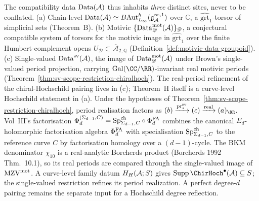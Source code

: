 \begin{remark}
\label{rem:motivic-sv-crosslevel}
The compatibility data $\mathrm{Data}(\mathcal{A})$ thus inhabits \emph{three}
distinct sites, never to be conflated.
\textup{(a)} Chain-level
$\mathrm{Data}(\mathcal{A})\simeq B\mathrm{Aut}^h_{L_\infty}(\mathfrak g^{\infty,1}_{\mathcal{A}})$
over $\mathbb C$, a $\widehat{\mathrm{grt}}_1$-torsor of
simplicial sets (Theorem~B).
\textup{(b)} Motivic
$\{\mathrm{Data}^{\mathrm{mot}}_{\mathscr D}(\mathcal{A})\}_{\mathscr D}$, a conjectural
compatible system of torsors for the motivic image in
$\widehat{\mathrm{grt}}_1$ over the finite Humbert-complement opens
$U_{\mathscr D}\subset\overline{\mathcal A}_{2,\mathbb Q}$
(Definition~\ref{def:motivic-data-groupoid}).
\textup{(c)} Single-valued $\mathrm{Data}^{\mathrm{sv}}(\mathcal{A})$, the image of
$\mathrm{Data}^{\mathrm{mot}}_{\mathscr D}(\mathcal{A})$ under Brown's single-valued period
projection, carrying
$\mathrm{Gal}(\CC/\RR)$-invariant real motivic periods
(Theorem~\ref{thm:sv-scope-restriction-chiralhoch}).
The real-period refinement of the chiral-Hochschild pairing lives in
(c); Theorem~H itself is a curve-level Hochschild statement in (a).
Under the hypotheses of Theorem~\ref{thm:sv-scope-restriction-chiralhoch},
period realisation factors as
$(b)\xrightarrow{\proj_*}(c)\xrightarrow{\mathrm{real}}(a)_\RR$.
Vol~III's factorisation
$\Phi_d^{(\Sigma_{d-1},C)} = \mathrm{Sp}^{\mathrm{ch}}_{\Sigma_{d-1}, C} \circ \Phi^{\mathrm{FA}}_d$
combines the canonical $E_d$-holomorphic factorisation algebra
$\Phi^{\mathrm{FA}}_d$ with specialisation
$\mathrm{Sp}^{\mathrm{ch}}_{\Sigma_{d-1}, C}$ to the reference curve $C$ by
factorisation homology over a $(d{-}1)$-cycle. The BKM denominator
$\chi_{10}$ is a real-analytic Borcherds product
(Borcherds 1992 Thm.~10.1), so its real periods are compared through
the single-valued image of $\mathrm{MZV}^{\mathrm{mot}}$.  A curve-level family datum
$H_H(\mathcal{A};S)$ gives
$\operatorname{Supp}\ChirHoch^\bullet(\cA)\subseteq S$; the
single-valued restriction refines its period realization.  A perfect
degree-$d$ pairing remains the separate input for a Hochschild degree
reflection.
\end{remark}
